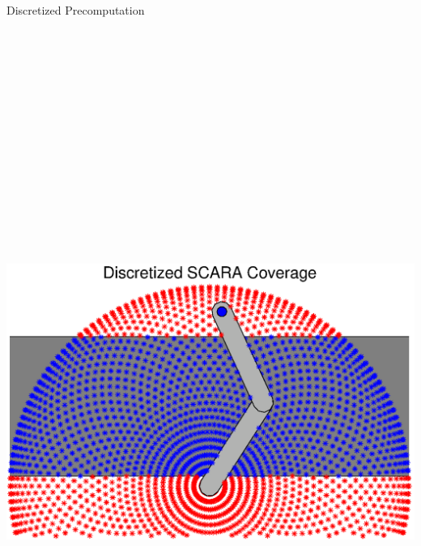 \documentclass[final]{beamer}
\begin{document}
\begin{frame}{}
{\begin{columns}[t]
\begin{column}{.30\linewidth}
\begin{block}{\centering Discretized Precomputation}
	\vspace{0.5cm}
\centering\includegraphics[height=25cm, width = 29cm]{figures/SCARA_coverage.eps}\\

\vspace{0.5cm}

\begin{itemize}
	\setlength{\itemindent}{0.32in}


\end{itemize}
\end{block}
\end{column}
\end{columns}}
\end{frame}
\end{document}
